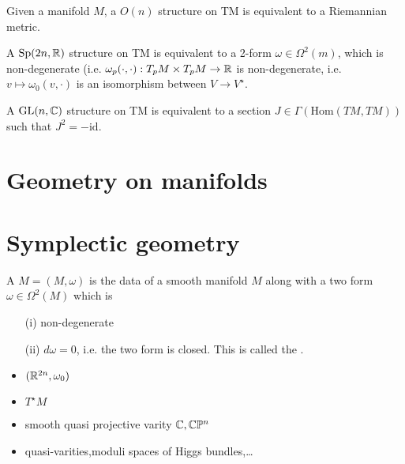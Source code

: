 \begin{corollary}
    Given a manifold \(M\), a \(O(n)\) structure on TM is equivalent to a Riemannian metric.
\end{corollary}

\begin{proposition}
    A \(\text{Sp}(2n,\mathbb{R})\) structure on TM is equivalent to a 2-form \(\omega\in \Omega^2(m)\), which is non-degenerate (i.e. \(\omega_p(\cdot,\cdot):T_p M\times T_pM\to\mathbb{R}\) is non-degenerate, i.e. \(v\mapsto \omega_0(v,\cdot)\) is an isomorphism between \(V\to V^\star\).

    A \(\text{GL}(n,\mathbb{C})\) structure on TM is equivalent to a section \(J\in\Gamma(\text{Hom}(TM,TM))\)
    such that \(J^2=-\text{id}\).
\end{proposition}

\section{Geometry on manifolds}

\section{Symplectic geometry}

\begin{definition*}
    A  \(M=(M,\omega)\) is the data of a smooth manifold \(M\) along with
    a two form \(\omega\in \Omega^2(M)\) which is \begin{enumerate}
        \item[(i)] non-degenerate
        \item[(ii)] \(d\omega=0\), i.e. the two form is closed. This is called the . 
    \end{enumerate} 
\end{definition*}

\begin{example}
    \begin{itemize}
        \item \((\mathbb{R}^{2n},\omega_0)\)
        \item \( T^\star M\)
        \item smooth quasi projective varity \(\mathbb{C},\mathbb{C}\mathbb{P}^n\)
        \item quasi-varities,moduli spaces of Higgs bundles,\dots  
    \end{itemize}
\end{example}


